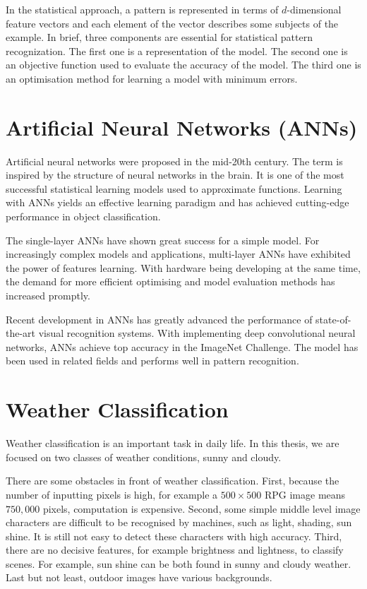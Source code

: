 In the statistical approach, a pattern is represented in terms of $d$-dimensional feature vectors and each element of the vector describes some subjects of the example. In brief, three components are essential for statistical pattern recognization. The first one is a representation of the model. The second one is an objective function used to evaluate the accuracy of the model. The third one is an optimisation method for learning a model with minimum errors.

\section{Artificial Neural Networks (ANNs)}

Artificial neural networks were proposed in the mid-20th century. The term is inspired by the structure of neural networks in the brain. It is one of the most successful statistical learning models used to approximate functions. Learning with ANNs yields an effective learning paradigm and has achieved cutting-edge performance in object classification. 

The single-layer ANNs  have shown great success for a simple model. For increasingly complex models and applications, multi-layer ANNs have exhibited the power of features learning. With hardware being developing at the same time, the demand for more efficient optimising and model evaluation methods has increased promptly. 

Recent development in ANNs has greatly advanced the performance of state-of-the-art visual recognition systems. With implementing deep convolutional neural networks, ANNs achieve top accuracy in the ImageNet Challenge. The model has been used in related fields and performs well in pattern recognition.

\section{Weather Classification}

Weather classification is an important task in daily life. In this thesis, we are focused on two classes of weather conditions, sunny and cloudy. 

There are some obstacles in front of weather classification. First, because the number of inputting pixels is high, for example a $500 \times 500$ RPG image means $750,000$ pixels, computation is expensive. Second, some simple middle level image characters are difficult to be recognised by machines, such as light, shading, sun shine. It is still not easy to detect these characters with high accuracy.  Third, there are no decisive features, for example brightness and lightness, to classify scenes. For example, sun shine can be both found in sunny and cloudy weather. Last but not least, outdoor images have various backgrounds.


